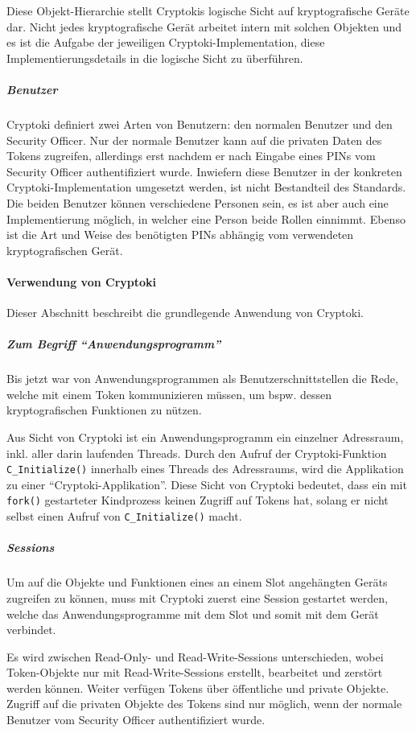 \documentclass[10pt,a4paper]{article}
\begin{document}
Diese Objekt-Hierarchie stellt Cryptokis logische Sicht auf kryptografische Geräte dar.
Nicht jedes kryptografische Gerät arbeitet intern mit solchen Objekten und es ist die
Aufgabe der jeweiligen Cryptoki-Implementation, diese Implementierungsdetails in die
logische Sicht zu überführen.

\subparagraph{Benutzer}
Cryptoki definiert zwei Arten von Benutzern: den normalen Benutzer und den Security
Officer. Nur der normale Benutzer kann auf die privaten Daten des Tokens zugreifen,
allerdings erst nachdem er nach Eingabe eines PINs vom Security Officer authentifiziert
wurde. Inwiefern diese Benutzer in der konkreten Cryptoki-Implementation umgesetzt werden,
ist nicht Bestandteil des Standards. Die beiden Benutzer können verschiedene Personen
sein, es ist aber auch eine Implementierung möglich, in welcher eine Person beide Rollen
einnimmt. Ebenso ist die Art und Weise des benötigten PINs abhängig vom verwendeten
kryptografischen Gerät.

\paragraph{Verwendung von Cryptoki}
Dieser Abschnitt beschreibt die grundlegende Anwendung von Cryptoki.

\subparagraph{Zum Begriff "`Anwendungsprogramm"'}
Bis jetzt war von Anwendungsprogrammen als Benutzerschnittstellen die Rede, welche mit
einem Token kommunizieren müssen, um bspw. dessen kryptografischen Funktionen zu nützen.

Aus Sicht von Cryptoki ist ein Anwendungsprogramm ein einzelner Adressraum, inkl. aller
darin laufenden Threads. Durch den Aufruf der Cryptoki-Funktion \texttt{C\_Initialize()}
innerhalb eines Threads des Adressraums, wird die Applikation zu einer
"`Cryptoki-Applikation"'. Diese Sicht von Cryptoki bedeutet, dass ein mit \texttt{fork()}
gestarteter Kindprozess keinen Zugriff auf Tokens hat, solang er nicht selbst einen Aufruf
von \texttt{C\_Initialize()} macht.

\subparagraph{Sessions}
Um auf die Objekte und Funktionen eines an einem Slot angehängten Geräts zugreifen zu
können, muss mit Cryptoki zuerst eine Session gestartet werden, welche das
Anwendungsprogramme mit dem Slot und somit mit dem Gerät verbindet.

Es wird zwischen Read-Only- und Read-Write-Sessions unterschieden, wobei Token-Objekte nur
mit Read-Write-Sessions erstellt, bearbeitet und zerstört werden können. Weiter verfügen
Tokens über öffentliche und private Objekte. Zugriff auf die privaten Objekte des Tokens
sind nur möglich, wenn der normale Benutzer vom Security Officer authentifiziert wurde.
\end{document}
